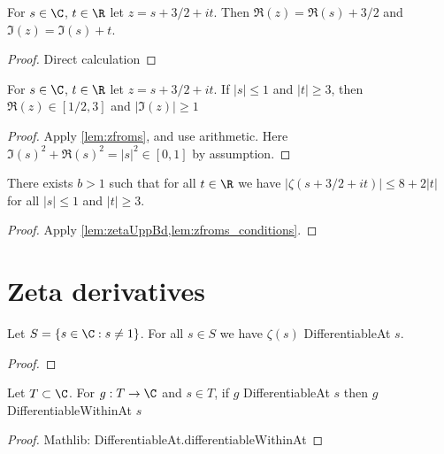 \begin{lemma}\label{lem:zfroms}
\leanok
For $s\in \C$, $t\in\R$ let $z=s+3/2+it$. Then $\Re(z) = \Re(s)+3/2$ and $\Im(z)=\Im(s)+t$.
\end{lemma}
\begin{proof}
\leanok
Direct calculation
\end{proof}

\begin{lemma} \label{lem:zfroms_conditions}
\leanok
For $s\in \C$, $t\in\R$ let $z=s+3/2+it$. If $|s|\le 1$ and $|t|\ge3$, then $\Re(z) \in [1/2, 3]$ and $|\Im(z)|\ge 1$
\end{lemma}
\begin{proof}
\leanok
{}
Apply \cref{lem:zfroms}, and use arithmetic. Here $\Im(s)^2 + \Re(s)^2 = |s|^2 \in [0,1]$ by assumption.
\end{proof}

\begin{lemma}\label{lem:zetaUppBound}
\leanok
There exists $b>1$ such that for all $t\in\R$ we have $|\zeta(s+3/2+it)| \le 8+2|t|$ for all $|s|\le 1$ and $|t|\ge3$.
\end{lemma}
\begin{proof}
\leanok
{}
Apply \cref{lem:zetaUppBd,lem:zfroms_conditions}.
\end{proof}


\section{Zeta derivatives}


\begin{lemma}\label{lem:zetadiffAtnot1}
\leanok
Let $S=\{s\in \C : s\neq 1\}$. For all $s\in S$ we have $\zeta(s)$ DifferentiableAt $s$.
\end{lemma}
\begin{proof}
\leanok
\end{proof}


\begin{lemma}[At to within]\label{lem:DiffAtWithinAt}
\leanok
Let $T\subset\C$. For $g:T\to\C$ and $s\in T$, if $g$ DifferentiableAt $s$ then $g$ DifferentiableWithinAt $s$
\end{lemma}
\begin{proof}
\leanok
Mathlib: DifferentiableAt.differentiableWithinAt
\end{proof}

